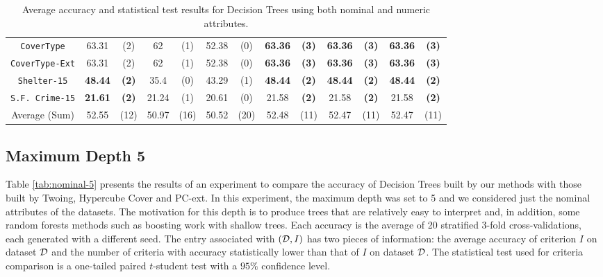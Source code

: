 \begin{table}
\begin{tabular}{c|cc|cc|cc|cc|cc|cc}
{\tt CoverType}    & 63.31          &  (2)      & 62         & (1)          & 52.38       &  (0)              & {\bf 63.36} &  {\bf (3)}   & {\bf 63.36} & {\bf (3)}& {\bf 63.36} & {\bf (3)} \\  
{\tt CoverType-Ext}& 63.31          &  (2)      & 62         & (1)          & 52.38       &  (0)              & {\bf 63.36} &  {\bf (3)}   & {\bf 63.36} & {\bf (3)}& {\bf 63.36} & {\bf (3)} \\  
{\tt Shelter-15}   & {\bf 48.44}    & {\bf (2)} & 35.4       & (0)          & 43.29       &  (1)              & {\bf 48.44} &  {\bf (2)}   & {\bf 48.44} & {\bf (2)}& {\bf 48.44} & {\bf (2)} \\   
{\tt S.F. Crime-15}& {\bf 21.61}    & {\bf (2)} & 21.24      & (1)          & 20.61       &  (0)              & 21.58       &  {\bf (2)}   & 21.58       & {\bf (2)}& 21.58       & {\bf (2)} \\ 
\hline
Average (Sum)      & 52.55          &  (12)     & 50.97      & (16)         & 50.52       &  (20)             & 52.48       &  (11)        & 52.47       &  (11)    & 52.47       & (11)

\end{tabular}
\caption{Average accuracy and statistical test results for  Decision Trees using both nominal and numeric attributes.}
\label{exp:numeric-1}
\normalsize
\end{table}



\subsection{Maximum Depth 5}
\label{subsec:depth-5}

Table \ref{tab:nominal-5} presents  the results of an experiment to
compare the accuracy of  Decision Trees built by  our methods with those built by Twoing, Hypercube Cover and PC-ext.
In this experiment, the maximum depth was set to 5 and we considered just the nominal attributes of the datasets. 
The motivation for this depth is to produce trees that
are relatively easy to interpret and, in addition, some random
forests methods such as boosting work with shallow trees.
Each accuracy is the average of 20 stratified 3-fold cross-validations,
each generated with a different seed.
\small
The entry  associated with  $({\cal D},I)$ has two pieces of information: the average accuracy
of criterion $I$ on dataset ${\cal D}$ and the number of criteria
with accuracy   statistically lower than that of $I$ on dataset ${\cal D}$. 
The statistical test used for criteria comparison is a  one-tailed paired $t$-student test with a $95\% $ confidence level.

